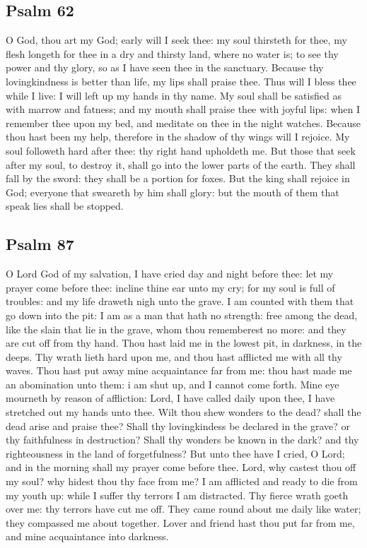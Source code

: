 \subsection{Psalm 62}

O God, thou art my God; early will I seek thee: my soul thirsteth for thee, my flesh longeth for thee in a dry and thirsty land, where no water is; to see thy power and thy glory, so as I have seen thee in the sanctuary. Because thy lovingkindness is better than life, my lips shall praise thee. Thus will I bless thee while I live: I will left up my hands in thy name. My soul shall be satisfied as with marrow and fatness; and my mouth shall praise thee with joyful lips: when I remember thee upon my bed, and meditate on thee in the night watches. Because thou hast been my help, therefore in the shadow of thy wings will I rejoice. My soul followeth hard after thee: thy right hand upholdeth me. But those that seek after my soul, to destroy it, shall go into the lower parts of the earth. They shall fall by the sword: they shall be a portion for foxes. But the king shall rejoice in God; everyone that sweareth by him shall glory: but the mouth of them that speak lies shall be stopped.

\subsection{Psalm 87}

O Lord God of my salvation, I have cried day and night before thee: let my prayer come before thee: incline thine ear unto my cry; for my soul is full of troubles: and my life draweth nigh unto the grave. I am counted with them that go down into the pit: I am as a man that hath no strength: free among the dead, like the slain that lie in the grave, whom thou rememberest no more: and they are cut off from thy hand. Thou hast laid me in the lowest pit, in darkness, in the deeps. Thy wrath lieth hard upon me, and thou hast afflicted me with all thy waves. Thou hast put away mine acquaintance far from me: thou hast made me an abomination unto them: i am shut up, and I cannot come forth. Mine eye mourneth by reason of affliction: Lord, I have called daily upon thee, I have stretched out my hands unto thee. Wilt thou shew wonders to the dead? shall the dead arise and praise thee? Shall thy lovingkindess be declared in the grave? or thy faithfulness in destruction? Shall thy wonders be known in the dark? and thy righteousness in the land of forgetfulness? But unto thee have I cried, O Lord; and in the morning shall my prayer come before thee. Lord, why castest thou off my soul? why hidest thou thy face from me? I am afflicted and ready to die from my youth up: while I suffer thy terrors I am distracted. Thy fierce wrath goeth over me: thy terrors have cut me off. They came round about me daily like water; they compassed me about together. Lover and friend hast thou put far from me, and mine acquaintance into darkness.

